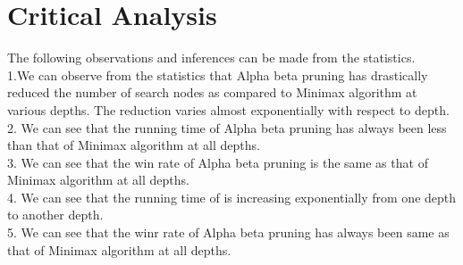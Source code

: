 \documentclass[11pt]{article}
\begin{document}
  
\section{  Critical Analysis }



The following observations and inferences can be made from the statistics.\\
1.We can observe from the statistics that Alpha beta pruning has  drastically reduced the number of search nodes as compared to Minimax algorithm  at various depths. The reduction varies almost exponentially with respect to depth. \\
2. We can see that  the running time of   Alpha beta pruning has always been less than that of Minimax algorithm at all depths.\\
3. We can see that  the win rate  of   Alpha beta pruning is the same as that of Minimax algorithm at all depths.\\
4. We can see that  the running time of is increasing exponentially from one depth to another depth.\\
5. We can see that  the winr rate of   Alpha beta pruning has always been same as that of  Minimax algorithm at all depths.\\
\end{document}
